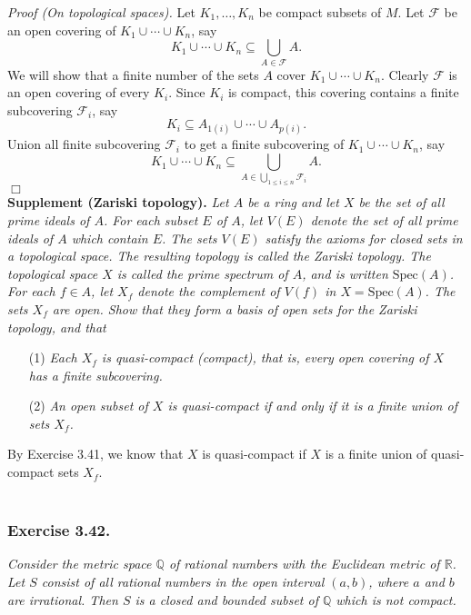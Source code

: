 \documentclass{article}
\begin{document}
\emph{Proof (On topological spaces).}
Let $K_1, \ldots, K_n$ be compact subsets of $M$.
Let $\mathscr{F}$ be an open covering of $K_1 \cup \cdots \cup K_n$, say
$$K_1 \cup \cdots \cup K_n \subseteq \bigcup_{A \in \mathscr{F}}A.$$
We will show that a finite number of the sets $A$ cover $K_1 \cup \cdots \cup K_n$.
Clearly $\mathscr{F}$ is an open covering of every $K_i$.
Since $K_i$ is compact, this covering contains a finite subcovering $\mathscr{F}_i$,
say
$$K_i \subseteq A_{1(i)} \cup \cdots \cup A_{p(i)}.$$
Union all finite subcovering $\mathscr{F}_i$ to get a finite subcovering of
$K_1 \cup \cdots \cup K_n$, say
$$K_1 \cup \cdots \cup K_n \subseteq
\bigcup_{A \in \bigcup_{1 \leq i \leq n} \mathscr{F}_i}A.$$
$\Box$ \\

\textbf{Supplement (Zariski topology).}
\emph{Let $A$ be a ring and let $X$ be the set of all prime ideals of $A$.
For each subset $E$ of $A$,
let $V(E)$ denote the set of all prime ideals of $A$ which contain $E$.
The sets $V(E)$ satisfy
the axioms for closed sets in a topological space.
The resulting topology is called the Zariski topology.
The topological space $X$ is called the prime spectrum of $A$,
and is written $\text{Spec}(A)$.} \\

\emph{For each $f \in A$,
let $X_f$ denote the complement of $V(f)$ in $X = \text{Spec}(A)$.
The sets $X_f$ are open.
Show that they form a basis of open sets for the Zariski topology, and that}
\begin{enumerate}
\item[(1)]
\emph{Each $X_f$ is quasi-compact (compact), that is,
every open covering of $X$ has a finite subcovering.}
\item[(2)]
\emph{An open subset of $X$ is quasi-compact if and only if
it is a finite union of sets $X_f$.} \\
\end{enumerate}

By Exercise 3.41, we know that $X$ is quasi-compact if
$X$ is a finite union of quasi-compact sets $X_f$. \\\\






\subsubsection*{Exercise 3.42.}
\emph{Consider the metric space $\mathbb{Q}$ of rational numbers with
the Euclidean metric of $\mathbb{R}$.
Let $S$ consist of all rational numbers in the open interval $(a,b)$,
where $a$ and $b$ are irrational.
Then $S$ is a closed and bounded subset of $\mathbb{Q}$ which is not compact.} \\
\end{document}
